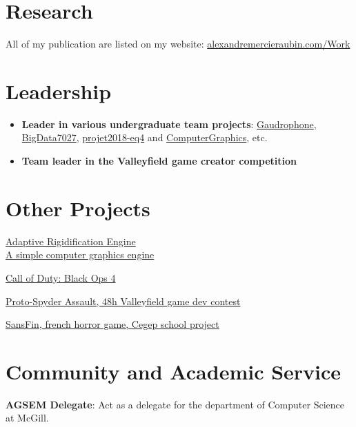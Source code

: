 \documentclass[10pt]{article} %
\begin{document}
\section{Research}
All of my publication are listed on my website: \href{https://alexandremercieraubin.com/Work}{alexandremercieraubin.com/Work}


\section{Leadership}
\begin{itemize}
\item \textbf{Leader in various undergraduate team projects}: \href{https://github.com/AlexandreMercierAubin/Gaudrophone}{Gaudrophone}, \href{https://github.com/AlexandreMercierAubin/BigData7027}{BigData7027}, \href{https://github.com/AlexandreMercierAubin/projet2018-eq4}{projet2018-eq4} and \href{https://github.com/AlexandreMercierAubin/ComputerGraphics}{ComputerGraphics}, etc. \\ 
\item \textbf{Team leader in the Valleyfield game creator competition}
\end{itemize}

\section{Other Projects}

{
\href{https://github.com/AlexandreMercierAubin/AdaptiveRigidification2022}{Adaptive Rigidification Engine}\\
\href{https://github.com/AlexandreMercierAubin/ComputerGraphics}{A simple computer graphics engine}\\

}

{
\href{https://www.callofduty.com/ca/en/blackops4}{Call of Duty: Black Ops 4}

\href{https://youtu.be/qJjy8b0kuSY}{Proto-Spyder Assault, 48h Valleyfield game dev contest}

\href{https://youtu.be/s6vr07Nt1IY}{SansFin, french horror game, Cegep school project}
}

\section{Community and Academic Service}
\textbf{AGSEM Delegate}: Act as a delegate for the department of Computer Science at McGill.
\end{document}
